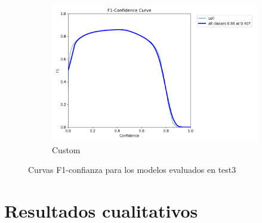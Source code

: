 \documentclass[12pt,a4paper,onecolumn,oneside]{report}
\begin{document}
\begin{figure}[H]
  \vspace{0.5cm}
  \begin{subfigure}[b]{0.48\textwidth}
    \centering
    \includegraphics[width=\textwidth]{figuras/resultados experimentacion/custom/test3/BoxF1_curve.png}
    \caption{Custom}
    \label{fig:custom_test3}
  \end{subfigure}
  
  \caption{Curvas F1-confianza para los modelos evaluados en test3}
  \label{fig:f1_curves_test3}
\end{figure}


\section{Resultados cualitativos}
\label{sec:Resultados cualitativos anexo}
\end{document}
